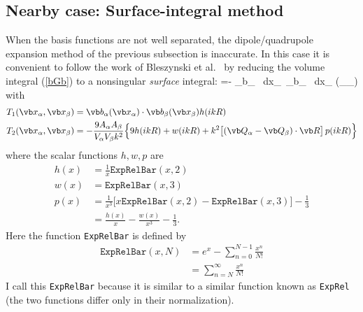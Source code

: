 \documentclass[letterpaper]{article}
\begin{document}
\subsection{Nearby case: Surface-integral method}
When the basis functions are not well separated, the
dipole/quadrupole expansion method of the previous 
subsection is inaccurate. In this case it is convenient 
to follow the work of Bleszynski et al.~\cite{} by reducing 
the volume integral (\ref{bGb}) to a nonsingular 
\textit{surface} integral:
{
=- 
  \int_{\partial \sup \vb b_\alpha} \, \!\!\!\!\! d\vb x_\alpha \,
  \int_{\partial \sup \vb b_\alpha} \, \!\!\!\!\! d\vb x_\beta
  \Big(_\alpha \cdot {}_\beta\Big)
}
with
\begin{align*} 
     T_1(\vb x_\alpha, \vb x_\beta) 
  &= \vb b_\alpha(\vb x_\alpha ) \cdot \vb b_\beta(\vb x_\beta)
     h(ik R)
\\
     T_2(\vb x_\alpha, \vb x_\beta) 
  &= -\frac{9A_\alpha A_\beta}{V_\alpha V_\beta k^2}
      \Big\{ 9h(ikR) + w(ikR) 
             +k^2\big[(\vb Q_\alpha - \vb Q_\beta)\cdot \vb R\big]\,p(ikR)
      \Big\}
\end{align*} 
where the scalar functions $h,w,p$ are 
\begin{align*}
  h(x) &= \frac{1}{x}\texttt{ExpRelBar}(x,2) \\
  w(x) &= \texttt{ExpRelBar}(x,3) \\
  p(x) &= \frac{1}{x^3}\Big[ x\texttt{ExpRelBar}(x,2) 
                            - \texttt{ExpRelBar}(x,3)\Big] - \frac{1}{3}
\\
       &= \frac{h(x)}{x} - \frac{w(x)}{x^3} - \frac{1}{3}.
\end{align*}
Here the function \texttt{ExpRelBar} is defined by 
\begin{align*}
 \texttt{ExpRelBar}(x,N) 
&= e^{x} - \sum_{n=0}^{N-1} \frac{x^{n}}{N!}
\\
&= \sum_{n=N}^\infty \frac{x^n}{N!}
\end{align*}
I call this \texttt{ExpRelBar} because it is similar to
a similar function known as \texttt{ExpRel} (the two
functions differ only in their normalization).
\end{document}
